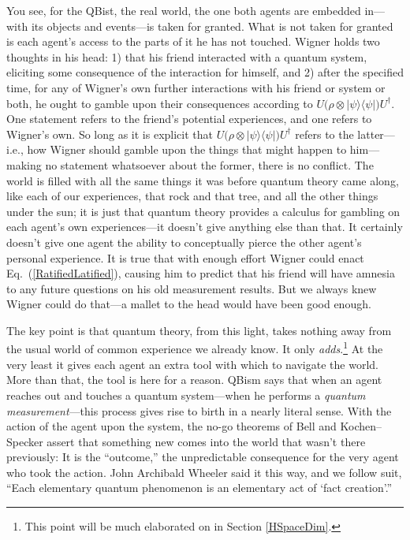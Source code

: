\documentclass[aps,pra,superscriptaddress,10pt,tightenlines,twocolumn,nofootinbib]{revtex4}
\begin{document}
You see, for the QBist, the real world, the one both agents are embedded in---with its objects and events---is taken for granted.  What is not taken for granted is each agent's access to the parts of it he has not touched.  Wigner holds two thoughts in his head: 1) that his friend interacted with a quantum system, eliciting some consequence of the interaction for himself, and 2) after the specified time, for any of Wigner's own further interactions with his friend or system or both, he ought to gamble upon their consequences according to $U\big(\rho\otimes|\psi\rangle\langle\psi|\big)U^\dagger$.  One statement refers to the friend's potential experiences, and one refers to Wigner's own.  So long as it is explicit that $U\big(\rho\otimes|\psi\rangle\langle\psi|\big)U^\dagger$ refers to the latter---i.e., how Wigner should gamble upon the things that might happen to him---making no statement whatsoever about the former, there is no conflict.  The world is filled with all the same things it was before quantum theory came along, like each of our experiences, that rock and that tree, and all the other things under the sun; it is just that quantum theory provides a calculus for gambling on each agent's own experiences---it doesn't give anything else than that.  It certainly doesn't give one agent the ability to conceptually pierce the other agent's personal experience.  It is true that with enough effort Wigner could enact Eq.~(\ref{RatifiedLatified}), causing him to predict that his friend will have amnesia to any future questions on his old measurement results.  But we always knew Wigner could do that---a mallet to the head would have been good enough.

The key point is that quantum theory, from this light, takes nothing away from the usual world of common experience we already know.  It only {\it adds}.\footnote{This point will be much elaborated on in Section \ref{HSpaceDim}.}  At the very least it gives each agent an extra tool with which to navigate the world.  More than that, the tool is here for a reason.  QBism says that when an agent reaches out and touches a quantum system---when he performs a {\it quantum measurement}---this process gives rise to birth in a nearly literal sense.  With the action of the agent upon the system, the no-go theorems of Bell and Kochen--Specker assert that something new comes into the world that wasn't there previously:  It is the ``outcome,'' the unpredictable consequence for the very agent who took the action.  John Archibald Wheeler said it this way, and we follow suit, ``Each elementary quantum phenomenon is an elementary act of `fact creation'.''  \cite{Wheeler82c}
\end{document}
